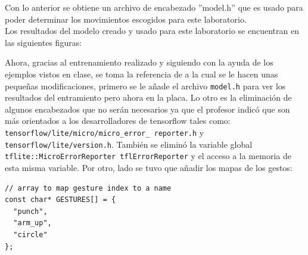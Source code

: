 Con lo anterior se obtiene un archivo de encabezado ''model.h'' que es usado para poder determinar los movimientos escogidos para este laboratorio.\\

Los resultados del modelo creado y usado para este laboratorio se encuentran en las siguientes figuras:

Ahora, gracias al entrenamiento realizado y siguiendo con la ayuda de los ejemplos vistos en clase, se toma la referencia de \cite{ArduinoSketches1} a la cual se le hacen unas pequeñas modificaciones, primero se le añade el archivo \texttt{model.h} para ver los resultados del entramiento pero ahora en la placa.
Lo otro es la eliminación de algunos encabezados que no serán necesarios ya que el profesor indicó que son más orientados a los desarrolladores de tensorflow tales como: \texttt{tensorflow/lite/micro/micro\_error\_ reporter.h} y \texttt{tensorflow/lite/version.h}. También se eliminó la variable global \texttt{tflite::MicroErrorReporter tflErrorReporter} y el acceso a la memoria de esta misma variable. Por otro, lado se tuvo que añadir los mapas de los gestos:\newpage
\begin{lstlisting}[label={mini_bloque}, caption={Nombre de los archivos csv}]
// array to map gesture index to a name
const char* GESTURES[] = {
  "punch",
  "arm_up",
  "circle"
};
\end{lstlisting}

